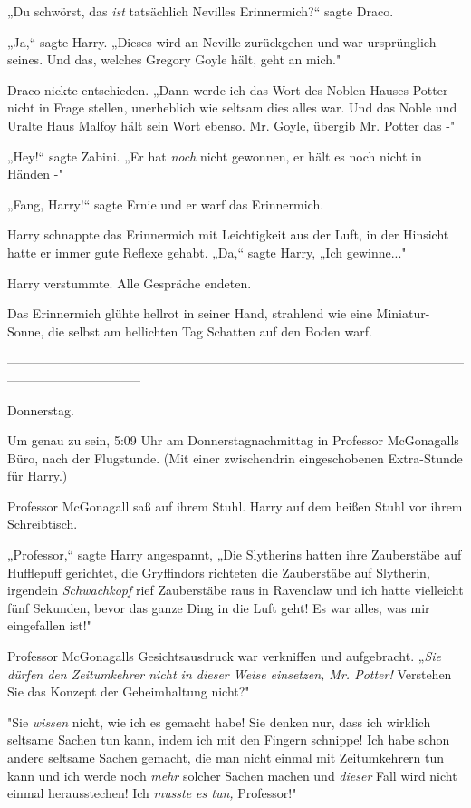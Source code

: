{„Du schwörst, das \emph{ist} tatsächlich Nevilles Erinnermich?“ sagte Draco.

„Ja,“ sagte Harry. „Dieses wird an Neville zurückgehen und war ursprünglich seines. Und das, welches Gregory Goyle hält, geht an mich."

Draco nickte entschieden. „Dann werde ich das Wort des Noblen Hauses Potter nicht in Frage stellen, unerheblich wie seltsam dies alles war. Und das Noble und Uralte Haus Malfoy hält sein Wort ebenso. Mr. Goyle, übergib Mr. Potter das -"

„Hey!“ sagte Zabini. „Er hat \emph{noch} nicht gewonnen, er hält es noch nicht in Händen -"

„Fang, Harry!“ sagte Ernie und er warf das Erinnermich.

Harry schnappte das Erinnermich mit Leichtigkeit aus der Luft, in der Hinsicht hatte er immer gute Reflexe gehabt. „Da,“ sagte Harry, „Ich gewinne..."

Harry verstummte. Alle Gespräche endeten.

Das Erinnermich glühte hellrot in seiner Hand, strahlend wie eine Miniatur-Sonne, die selbst am hellichten Tag Schatten auf den Boden warf.

--------------------------------------------------------------------------------------------------------------------------------------------

\hfill\break Donnerstag.

Um genau zu sein, 5:09 Uhr am Donnerstagnachmittag in Professor McGonagalls Büro, nach der Flugstunde. (Mit einer zwischendrin eingeschobenen Extra-Stunde für Harry.)

Professor McGonagall saß auf ihrem Stuhl. Harry auf dem heißen Stuhl vor ihrem Schreibtisch.

„Professor,“ sagte Harry angespannt, „Die Slytherins hatten ihre Zauberstäbe auf Hufflepuff gerichtet, die Gryffindors richteten die Zauberstäbe auf Slytherin, irgendein \emph{Schwachkopf} rief Zauberstäbe raus in Ravenclaw und ich hatte vielleicht fünf Sekunden, bevor das ganze Ding in die Luft geht! Es war alles, was mir eingefallen ist!"

Professor McGonagalls Gesichtsausdruck war verkniffen und aufgebracht. „\emph{Sie dürfen den Zeitumkehrer nicht in dieser Weise einsetzen, Mr. Potter!} Verstehen Sie das Konzept der Geheimhaltung nicht?"

"Sie \emph{wissen} nicht, wie ich es gemacht habe! Sie denken nur, dass ich wirklich seltsame Sachen tun kann, indem ich mit den Fingern schnippe! Ich habe schon andere seltsame Sachen gemacht, die man nicht einmal mit Zeitumkehrern tun kann und ich werde noch \emph{mehr} solcher Sachen machen und \emph{dieser} Fall wird nicht einmal herausstechen! Ich \emph{musste es tun,} Professor!"

}
